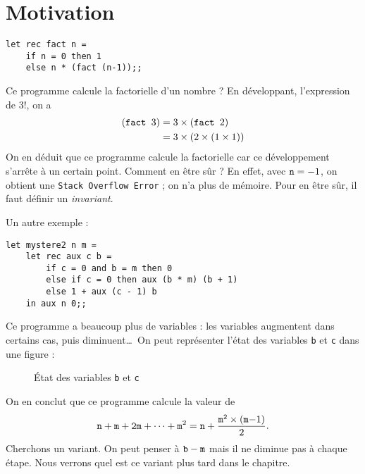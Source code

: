 \section{Motivation}

\begin{lstlisting}[language=caml, caption=Calcul de factorielle]
let rec fact n =
	if n = 0 then 1
	else n * (fact (n-1));;
\end{lstlisting}

Ce programme calcule la factorielle d'un nombre ? En développant, l'expression de $3!$, on a
\begin{align*}
	(\text{\tt fact } 3) &= 3 \times (\text{\tt fact } 2) \\
	&= 3 \times (2 \times (1 \times 1)) \\
\end{align*}
On en déduit que ce programme calcule la factorielle car ce développement s'arrête à un certain point. Comment en être sûr ? En effet, avec $\text{\tt n} = -1$, on obtient une {\tt Stack Overflow Error} ; on n'a plus de mémoire.
Pour en être sûr, il faut définir un {\it invariant}.


Un autre exemple : 

\begin{lstlisting}[language=caml, caption=Un programme mystère (2)]
let mystere2 n m =
	let rec aux c b =
		if c = 0 and b = m then 0
		else if c = 0 then aux (b * m) (b + 1)
		else 1 + aux (c - 1) b
	in aux n 0;;
\end{lstlisting}

Ce programme a beaucoup plus de variables : les variables augmentent dans certains cas, puis diminuent\ldots\ On peut représenter l'état des variables {\tt b} et {\tt c} dans une figure :

\begin{figure}[H]
	\centering
	\caption{État des variables {\tt b} et {\tt c}}
\end{figure}

On en conclut que ce programme calcule la valeur de \[
	\tt n + m + 2m + \cdots + m^{\rm 2} = n + \frac{m^2\times (m{\rm -1})}{\rm 2}
.\]
Cherchons un variant. On peut penser à $\tt b - m$\/ mais il ne diminue pas à chaque étape. Nous verrons quel est ce variant plus tard dans le chapitre.

